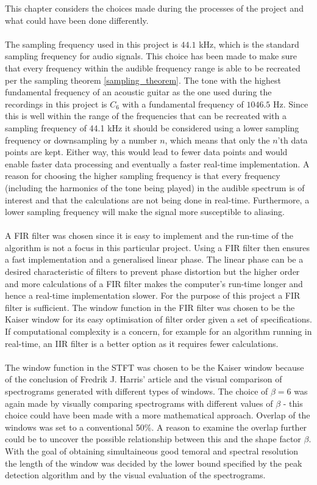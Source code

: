 This chapter considers the choices made during the processes of the project and what could have been done differently.
\\ \\
The sampling frequency used in this project is $44.1$ kHz, which is the standard sampling frequency for audio signals.
This choice has been made to make sure that every frequency within the audible frequency range is able to be recreated per the sampling theorem \ref{sampling_theorem}.
The tone with the highest fundamental frequency of an acoustic guitar as the one used during the recordings in this project is $C_6$ with a fundamental frequency of $1046.5$ Hz.
Since this is well within the range of the frequencies that can be recreated with a sampling frequency of 44.1 kHz it should be considered using a lower sampling frequency or downsampling by a number $n$, which means that only the $n$'th data points are kept. Either way, this would lead to fewer data points and would enable faster data processing and eventually a faster real-time implementation.
A reason for choosing the higher sampling frequency is that every frequency (including the harmonics of the tone being played) in the audible spectrum is of interest and that the calculations are not being done in real-time.
Furthermore, a lower sampling frequency will make the signal more susceptible to aliasing.
\\ \\
A FIR filter was chosen since it is easy to implement and the run-time of the algorithm is not a focus in this particular project. Using a FIR filter then ensures a fast implementation and a generalised linear phase. The linear phase can be a desired characteristic of filters to prevent phase distortion but the higher order and more calculations of a FIR filter makes the computer's run-time longer and hence a real-time implementation slower. For the purpose of this project a FIR filter is sufficient. The window function in the FIR filter was chosen to be the Kaiser window for its easy optimisation of filter order given a set of specifications. If computational complexity is a concern, for example for an algorithm running in real-time, an IIR filter is a better option as it requires fewer calculations.
\\ \\
The window function in the STFT was chosen to be the Kaiser window because of the conclusion of Fredrik J. Harris' article and the visual comparison of spectrograms generated with different types of windows. The choice of $\beta=6$ was again made by visually comparing spectrograms with different values of $\beta$ - this choice could have been made with a more mathematical approach. Overlap of the windows was set to a conventional 50\%. A reason to examine the overlap further could be to uncover the possible relationship between this and the shape factor $\beta$. With the goal of obtaining simultaineous good temoral and spectral resolution the length of the window was decided by the lower bound specified by the peak detection algorithm and by the visual evaluation of the spectrograms.
